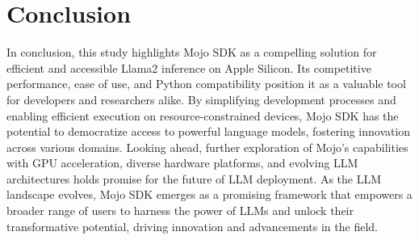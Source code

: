 \documentclass[sigconf]{acmart}
\begin{document}
\section{Conclusion}
In conclusion, this study highlights Mojo SDK as a compelling solution for efficient and accessible Llama2 inference on Apple Silicon. Its competitive performance, ease of use, and Python compatibility position it as a valuable tool for developers and researchers alike. By simplifying development processes and enabling efficient execution on resource-constrained devices, Mojo SDK has the potential to democratize access to powerful language models, fostering innovation across various domains.
Looking ahead, further exploration of Mojo's capabilities with GPU acceleration, diverse hardware platforms, and evolving LLM architectures holds promise for the future of LLM deployment. As the LLM landscape evolves, Mojo SDK emerges as a promising framework that empowers a broader range of users to harness the power of LLMs and unlock their transformative potential, driving innovation and advancements in the field.









\end{document}

